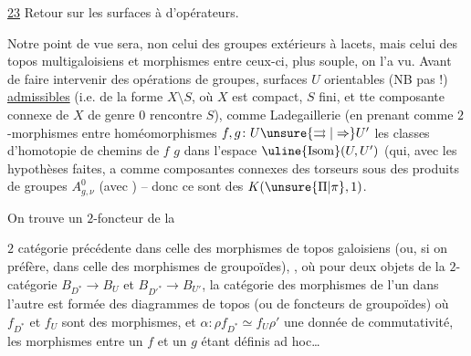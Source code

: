 \uline{23} Retour sur les surfaces à  d'opérateurs.

Notre point de vue sera, non celui des groupes extérieurs à lacets, mais celui des topos multigaloisiens et morphismes entre ceux-ci, plus souple, on l'a vu.
Avant de faire intervenir des opérations de groupes,   surfaces $U$ orientables (NB pas  !)   \uline{admissibles} (i.e. de la forme $X\setminus S$, où $X$ est compact, $S$ fini, et tte composante connexe de $X$ de genre $0$ rencontre $S$), comme  Ladegaillerie (en prenant comme $2$-morphismes entre  homéomorphismes $f,g\colon U\unsure{\rightrightarrows|\Rightarrow}U'$ les classes d'homotopie de chemins de $f$  $g$ dans l'espace $\uline{\mathrm{Isom}}(U,U')$ (qui, avec les hypothèses faites, a comme composantes connexes des  torseurs sous des produits de groupes $A_{g,\nu}^0$ (avec ) -- donc ce sont des $K(\unsure{\Pi|\pi},1)$.

On trouve un $2$-foncteur de la

$2$ catégorie précédente dans celle des morphismes de topos galoisiens (ou, si on préfère, dans celle des morphismes de groupoïdes), 
,
où pour deux objets de la $2$-catégorie $B_{D^*}\to B_U$ et $B_{D'^*}\to B_{U'}$, la catégorie des morphismes de l'un dans l'autre est formée des diagrammes    de topos (ou de foncteurs de groupoïdes)
où $f_{D^*}$ et $f_U$ sont des morphismes, et \deleted{\unsure{$\alpha$}} $\alpha\colon\rho f_{D^*}\simeq f_U\rho'$ une donnée de commutativité,  les morphismes entre un $f$ et un $g$ étant définis ad hoc\ldots

